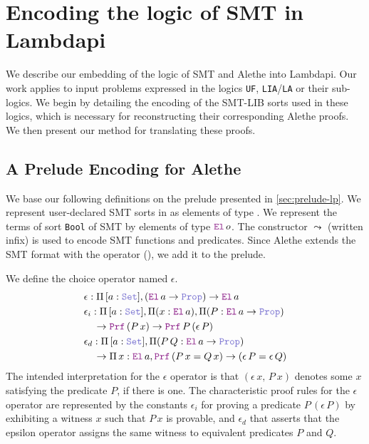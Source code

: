 
\chapter{Encoding the logic of SMT in Lambdapi} \label{ch:encoding}

We describe our embedding of the logic of SMT and Alethe into Lambdapi.
Our work applies to input problems expressed in the logics \texttt{UF}, \texttt{LIA}/\texttt{LA} or their sub-logics.
We begin by detailing the encoding of the SMT-LIB sorts used in these logics, which is necessary for reconstructing their corresponding Alethe proofs.
We then present our method for translating these proofs.

\section{A Prelude Encoding for Alethe}
\label{sec:encoding-prelude}

We base our following definitions on the prelude presented in \cref{sec:prelude-lp}.
We represent user-declared SMT sorts in \lpm{} as elements of type \set{}. We represent the terms of sort \lstinline[language=SMT,basicstyle=\ttfamily\normalsize]|Bool| of SMT by elements of type $\el{}\,o$.
The constructor $\leadsto$ (written infix) is used to encode SMT functions and predicates.
Since Alethe extends the SMT format with the  operator (\cite[\S 2.1]{alethespec}), we add it to the prelude. 

\begin{definition} \label{def:eps}
We define the choice operator named $\epsilon$.
\begin{align}
& \epsilon \index{$\epsilon$}: \Pi\, {[a: \set]}, (\el\,a \ra \prop) \ra \el\,a \\
& \epsilon_i \index{$\epsilon_i$}: \Pi\, {[a: \set]}, \Pi (x : \el\,a), \Pi (P : \el\,a \ra \prop) \\
& \quad \ra \prf\,(P\,x) \ra \prf\, P\,(\epsilon\,P)  \notag\\
& \epsilon_{d} \index{$\epsilon_d$}: \Pi\, {[a: \set]}, \Pi (P\,Q : \el\,a \ra \prop) \\
& \quad \ra \Pi\, x : \el\,a, \prf\,(P\,x = Q\,x) \ra (\epsilon \, P = \epsilon \, Q)  \notag
\end{align}
The intended interpretation for the $\epsilon$ operator is that $(\epsilon\,x,\, P~x)$ denotes some $x$ satisfying the predicate $P$, if there is one.
The characteristic proof rules for the $\epsilon$ operator are represented by the constants $\epsilon_i$ for proving a predicate $P\,(\epsilon\,P)$ by exhibiting a witness $x$ such that $P\,x$ is provable,
and $\epsilon_d$ that asserts that the epsilon operator assigns the same witness to equivalent predicates $P$ and $Q$.
\end{definition}


